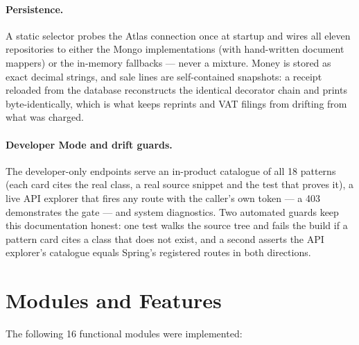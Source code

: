 \documentclass[12pt,a4paper]{report}
\begin{document}
\paragraph{Persistence.} A static selector probes the Atlas connection once at startup
and wires all eleven repositories to either the Mongo implementations (with hand-written
document mappers) or the in-memory fallbacks --- never a mixture. Money is stored as
exact decimal strings, and sale lines are self-contained snapshots: a receipt reloaded
from the database reconstructs the identical decorator chain and prints byte-identically,
which is what keeps reprints and VAT filings from drifting from what was charged.

\paragraph{Developer Mode and drift guards.} The developer-only endpoints serve an
in-product catalogue of all 18 patterns (each card cites the real class, a real source
snippet and the test that proves it), a live API explorer that fires any route with the
caller's own token --- a 403 demonstrates the gate --- and system diagnostics. Two
automated guards keep this documentation honest: one test walks the source tree and
fails the build if a pattern card cites a class that does not exist, and a second
asserts the API explorer's catalogue equals Spring's registered routes in both
directions.

\section{Modules and Features}
The following 16 functional modules were implemented:
\end{document}
